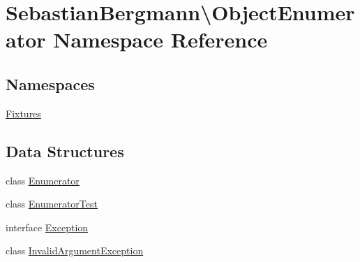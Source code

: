 \hypertarget{namespace_sebastian_bergmann_1_1_object_enumerator}{}\section{Sebastian\+Bergmann\textbackslash{}Object\+Enumerator Namespace Reference}
\label{namespace_sebastian_bergmann_1_1_object_enumerator}
\subsection*{Namespaces}
\begin{DoxyCompactItemize}
\item 
 \mbox{\hyperlink{namespace_sebastian_bergmann_1_1_object_enumerator_1_1_fixtures}{Fixtures}}
\end{DoxyCompactItemize}
\subsection*{Data Structures}
\begin{DoxyCompactItemize}
\item 
class \mbox{\hyperlink{class_sebastian_bergmann_1_1_object_enumerator_1_1_enumerator}{Enumerator}}
\item 
class \mbox{\hyperlink{class_sebastian_bergmann_1_1_object_enumerator_1_1_enumerator_test}{Enumerator\+Test}}
\item 
interface \mbox{\hyperlink{interface_sebastian_bergmann_1_1_object_enumerator_1_1_exception}{Exception}}
\item 
class \mbox{\hyperlink{class_sebastian_bergmann_1_1_object_enumerator_1_1_invalid_argument_exception}{Invalid\+Argument\+Exception}}
\end{DoxyCompactItemize}
